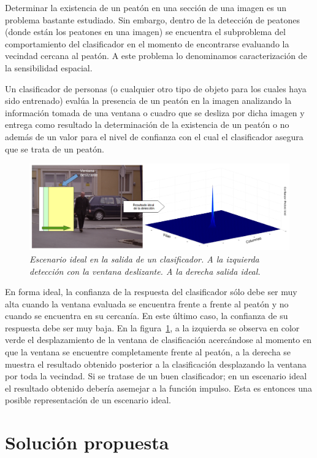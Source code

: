 Determinar la existencia de un peatón en una sección de una imagen es un problema bastante estudiado. Sin embargo, dentro de la detección de peatones (donde están los peatones en una imagen) se encuentra el subproblema del comportamiento del clasificador en el momento de encontrarse evaluando la vecindad cercana al peatón. A este problema lo denominamos caracterización de la sensibilidad espacial.

Un clasificador de personas (o cualquier otro tipo de objeto para los cuales haya sido entrenado) evalúa la presencia de un peatón en la imagen analizando la información tomada de una ventana o cuadro que se desliza por dicha imagen y entrega como resultado la determinación de la existencia de un peatón o no además de un valor para el nivel de confianza con el cual el clasificador asegura que se trata de un peatón.

\begin{figure}[H]
  \centering
  \includegraphics[scale=.3]{images/ejloesp}
  \caption{\em Escenario ideal en la salida de un clasificador. A la izquierda detección con la ventana deslizante. A la derecha salida ideal.} 
  \label{fig:ejloesp}
\end{figure}


En forma ideal, la confianza de la respuesta del clasificador sólo debe ser muy alta cuando la ventana evaluada se encuentra frente a frente al peatón y no cuando se encuentra en su cercanía. En este último caso, la confianza de su respuesta debe ser muy baja. En la figura~\ref{fig:ejloesp}, a la izquierda se observa en color verde el desplazamiento de la ventana de clasificación acercándose al momento en que la ventana se encuentre completamente frente al peatón, a la derecha se muestra el resultado obtenido posterior a la clasificación desplazando la ventana por toda la vecindad. Si se tratase de un buen clasificador; en un escenario ideal el resultado obtenido debería asemejar a la función impulso. Esta es entonces una posible representación de un escenario ideal.


\section{Soluci\'on propuesta}
\label{intro:solucion}

